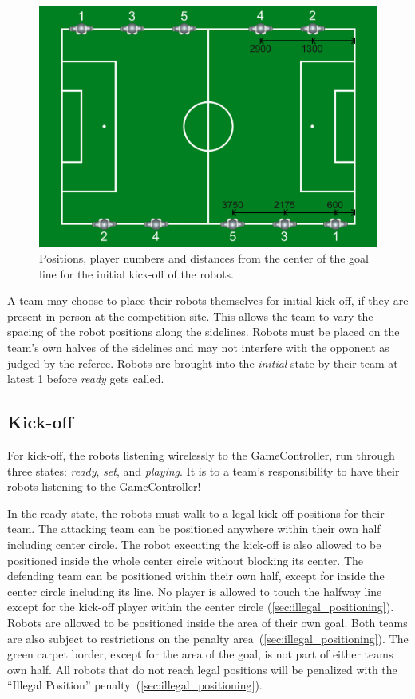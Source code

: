 \begin{figure}[t!]
	\begin{center}
		\leavevmode
		\includegraphics[width=1\columnwidth]{figs/initial_positions.pdf}
		\caption{Positions, player numbers and distances from the center of the goal line for the initial kick-off of the robots.}
		\label{fig:initial_positions}
	\end{center}
\end{figure}

A team may choose to place their robots themselves for initial kick-off, if they are present in person at the competition site. This allows the team to vary the spacing of the robot positions along the sidelines. Robots must be placed on the team's own halves of the sidelines and may not interfere with the opponent as judged by the referee. Robots are brought into the \textit{initial} state by their team at latest \qty{1}{\min} before \textit{ready} gets called.

\subsection{Kick-off}
\label{sec:kick-off}
For kick-off, the robots listening wirelessly to the GameController, run through three states: \emph{ready}, \emph{set}, and \emph{playing}.
It is to a team's responsibility to have their robots listening to the GameController!

In the ready state, the robots must walk to a legal kick-off positions for their team.
The attacking team can be positioned anywhere within their own half including center circle. The robot executing the kick-off is also allowed to be positioned inside the whole center circle without blocking its center.
The defending team can be positioned within their own half, except for inside the center circle including its line.
No player is allowed to touch the halfway line except for the kick-off player within the center circle (\cf \cref{sec:illegal_positioning}). Robots are allowed to be positioned inside the area of their own goal.
Both teams are also subject to restrictions on the penalty area~(\cf \cref{sec:illegal_positioning}).
The green carpet border, except for the area of the goal, is not part of either teams own half. All robots that do not reach legal positions will be penalized with the ``Illegal Position'' penalty~(\cf \cref{sec:illegal_positioning}).

